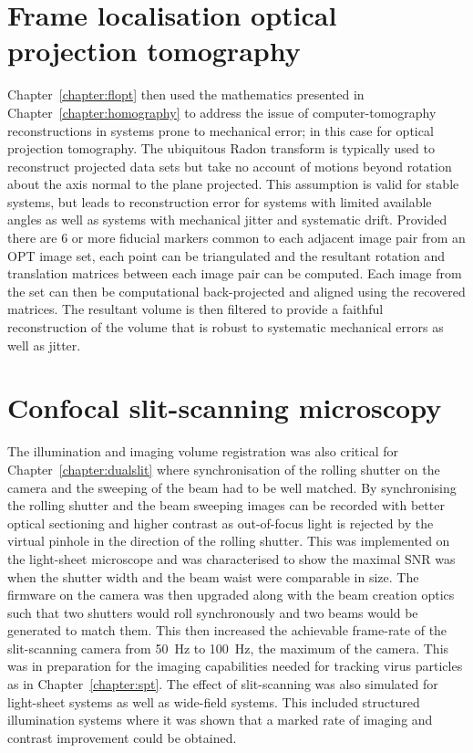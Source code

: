 \section{Frame localisation optical projection tomography}
Chapter~\ref{chapter:flopt} then used the mathematics presented in Chapter~\ref{chapter:homography} to address the issue of computer-tomography reconstructions in systems prone to mechanical error; in this case for optical projection tomography.
The ubiquitous Radon transform is typically used to reconstruct projected data sets but take no account of motions beyond rotation about the axis normal to the plane projected.
This assumption is valid for stable systems, but leads to reconstruction error for systems with limited available angles as well as systems with mechanical jitter and systematic drift.
Provided there are 6 or more fiducial markers common to each adjacent image pair from an \gls{OPT} image set, each point can be triangulated and the resultant rotation and translation matrices between each image pair can be computed.
Each image from the set can then be computational back-projected and aligned using the recovered matrices.
The resultant volume is then filtered to provide a faithful reconstruction of the volume that is robust to systematic mechanical errors as well as jitter.

\section{Confocal \gls{slit-scanning} microscopy}
The illumination and imaging volume registration was also critical for Chapter~\ref{chapter:dualslit} where synchronisation of the rolling shutter on the camera and the sweeping of the beam had to be well matched.
By synchronising the rolling shutter and the beam sweeping images can be recorded with better optical sectioning and higher contrast as out-of-focus light is rejected by the virtual pinhole in the direction of the rolling shutter.
This was implemented on the light-sheet microscope and was characterised to show the maximal \gls{SNR} was when the shutter width and the beam waist were comparable in size.
The firmware on the camera was then upgraded along with the beam creation optics such that two shutters would roll synchronously and two beams would be generated to match them.
This then increased the achievable frame-rate of the slit-scanning camera from \SI{50}{\hertz} to \SI{100}{\hertz}, the maximum of the camera.
This was in preparation for the imaging capabilities needed for tracking virus particles as in Chapter~\ref{chapter:spt}.
The effect of slit-scanning was also simulated for light-sheet systems as well as wide-field systems.
This included structured illumination systems where it was shown that a marked rate of imaging and contrast improvement could be obtained.

